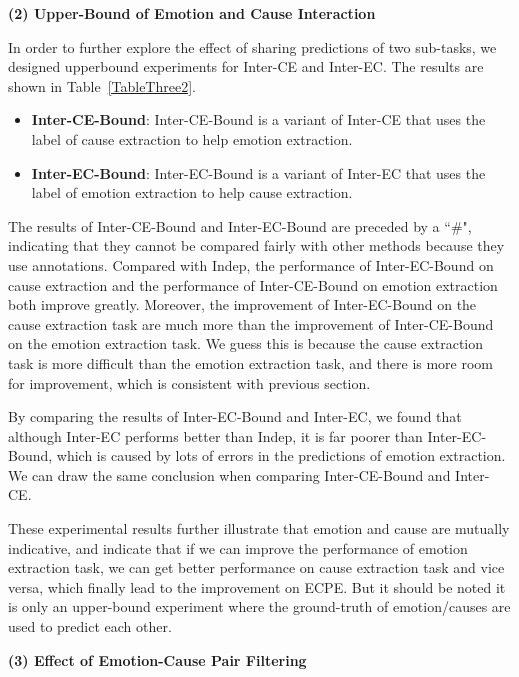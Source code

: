 \documentclass[11pt,a4paper]{article}
\begin{document}
\vspace{2mm}

\noindent \textbf{(2) Upper-Bound of Emotion and Cause Interaction}


In order to further explore the effect of sharing predictions of two sub-tasks, we designed upperbound experiments for Inter-CE and Inter-EC. The results are shown in Table~\ref{TableThree2}.

\begin{itemize}
	\item \textbf{Inter-CE-Bound}: Inter-CE-Bound is a variant of Inter-CE that uses the label of cause extraction to help emotion extraction.
	\item \textbf{Inter-EC-Bound}: Inter-EC-Bound is a variant of Inter-EC that uses the label of emotion extraction to help cause extraction. 	
\end{itemize}

The results of Inter-CE-Bound and Inter-EC-Bound are preceded by a ``\#", indicating that they cannot be compared fairly with other methods because they use annotations. Compared with Indep, the performance of Inter-EC-Bound on cause extraction and the performance of Inter-CE-Bound on emotion extraction both improve greatly. Moreover, the improvement of Inter-EC-Bound on the cause extraction task are much more than the improvement of Inter-CE-Bound on the emotion extraction task. We guess this is because the cause extraction task is more difficult than the emotion extraction task, and there is more room for improvement, which is consistent with previous section.

By comparing the results of Inter-EC-Bound and Inter-EC, we found that although Inter-EC performs better than Indep, it is far poorer than Inter-EC-Bound, which is caused by lots of errors in the predictions of emotion extraction. We can draw the same conclusion when comparing Inter-CE-Bound and Inter-CE.

These experimental results further illustrate that emotion and cause are mutually indicative, and indicate that if we can improve the performance of emotion extraction task, we can get better performance on cause extraction task and vice versa, which finally lead to the improvement on ECPE. But it should be noted it is only an upper-bound experiment where the ground-truth of emotion/causes are used to predict each other.

\vspace{2mm}

\noindent \textbf{(3) Effect of Emotion-Cause Pair Filtering}
\end{document}
